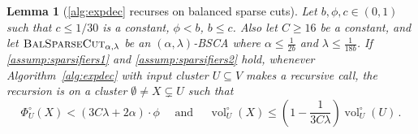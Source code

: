 \documentclass[epsfig,letter,11pt]{article}
\numberwithin{equation}{section}
\newcommand{\unvolc}[2]{\operatorname{vol}_{#2}^\circ (#1)}
\newcommand{\unspc}[2]{\Phi_{#2}^\circ (#1)}
\newcommand{\bsc}{\textsc{BalSparseCut}_{\alpha,\lambda}}
\newtheorem{lemma}[theorem]{Lemma}
\begin{document}
\begin{lemma}[\cref{alg:expdec} recurses on balanced sparse cuts]
	\label{lem:recursioncut}
	Let $b, \phi,c \in (0,1)$ such that $c \le 1/30$ is a constant, $\phi < b$, $b \le c$. Also  let $C \ge 16$ be a constant, and let $\bsc$ be an $(\alpha,\lambda)$-BSCA where $\alpha \le \frac{1}{2b}$ and $\lambda \le \frac{1}{18b}$. If \cref{assump:sparsifiers1} and \cref{assump:sparsifiers2} hold, whenever Algorithm~\ref{alg:expdec} with input cluster $U \subseteq V$ makes a recursive call, the recursion is on a cluster $\emptyset \neq X \subsetneq U$ such that
	\begin{equation*}
		\unspc{X}{U} < (3C\lambda+2\alpha)\cdot \phi \quad \text{ and } \quad \unvolc{X}{U} \le \left(1-\frac{1}{3C\lambda}\right)\unvolc{U}{U} \, .
	\end{equation*}
\end{lemma}
\end{document}
